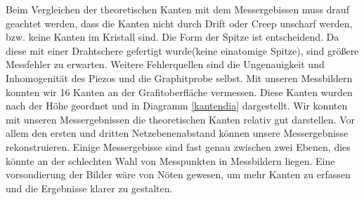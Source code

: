 \documentclass[10pt,a4paper]{article}
\begin{document}
Beim Vergleichen der theoretischen Kanten mit dem Messergebissen muss drauf geachtet werden, dass die Kanten nicht durch Drift oder Creep unscharf werden, bzw. keine Kanten im Kristall sind. Die Form der Spitze ist entscheidend. Da diese mit einer Drahtschere gefertigt wurde(keine einatomige Spitze), sind größere Messfehler zu erwarten. Weitere Fehlerquellen sind die Ungenauigkeit und Inhomogenität des Piezos und die Graphitprobe selbst.
Mit unseren Messbildern konnten wir 16 Kanten an der Grafitoberfläche vermessen. Diese Kanten wurden nach der Höhe geordnet und in Diagramm \ref{kantendia} dargestellt. Wir konnten mit unseren Messergebnissen die theoretischen Kanten relativ gut darstellen. Vor allem den ersten und dritten Netzebenenabstand können unsere Messergebnisse rekonstruieren. Einige Messergebisse sind fast genau zwischen zwei Ebenen, dies könnte an der schlechten Wahl von Messpunkten in Messbildern liegen. Eine vorsondierung der Bilder wäre von Nöten gewesen, um mehr Kanten zu erfassen und die Ergebnisse klarer zu gestalten.


\end{document}
